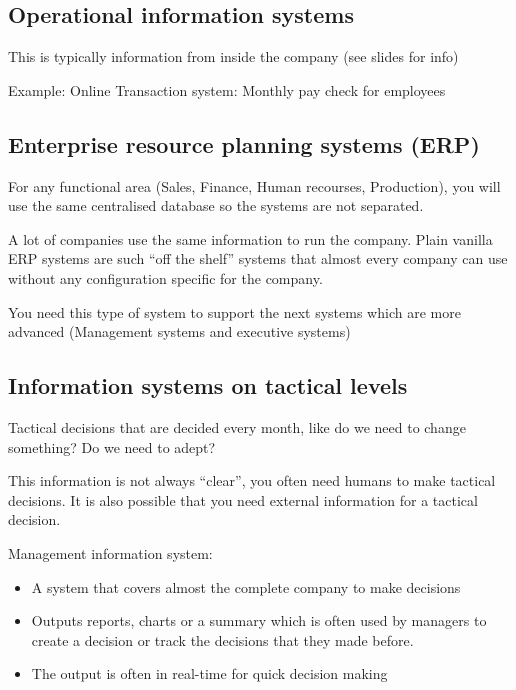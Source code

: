 \documentclass{article}
\begin{document}
\subsection{Operational information systems}

This is typically information from inside the company (see slides for info)

\hfill \newline
Example: Online Transaction system: Monthly pay check for employees

\subsection{Enterprise resource planning systems (ERP)}

For any functional area (Sales, Finance, Human recourses, Production), you will use the same centralised database so the systems are not separated.

\hfill \newline
A lot of companies use the same information to run the company. Plain vanilla ERP systems are such ``off the shelf'' systems that almost every company can use without any configuration specific for the company.

\hfill \newline
You need this type of system to support the next systems which are more advanced (Management systems and executive systems)

\subsection{Information systems on tactical levels}

Tactical decisions that are decided every month, like do we need to change something? Do we need to adept?

\hfill \newline
This information is not always ``clear'', you often need humans to make tactical decisions. It is also possible that you need external information for a tactical decision.

\hfill \newline
Management information system:

\begin{itemize}
\item  A system that covers almost the complete company to make decisions

\item  Outputs reports, charts or a summary which is often used by managers to create a decision or track the decisions that they made before.

\item  The output is often in real-time for quick decision making
\end{itemize}
\end{document}
